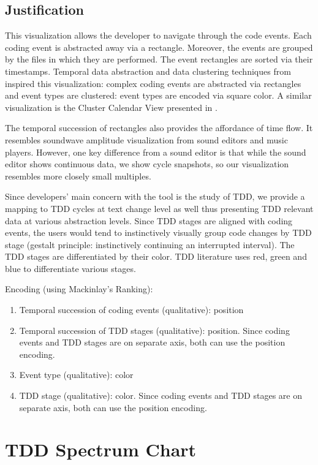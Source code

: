 \documentclass[journal]{vgtc}                %
\begin{document}
\subsection{Justification}

This visualization allows the developer to navigate through the code events.
Each coding event is abstracted away via a rectangle. Moreover, the events are grouped by the files in which they are performed. The event rectangles are sorted via their timestamps. Temporal data abstraction and data clustering techniques from \cite{one} inspired this visualization: complex coding events are abstracted via rectangles and event types are clustered: event types are encoded via square color. A similar visualization is the Cluster Calendar View presented in \cite{one}.

The temporal succession of rectangles also provides the affordance of time flow. It resembles soundwave amplitude visualization from sound editors and music players.
However, one key difference from a sound editor is that while the sound editor shows continuous data, we show cycle snapshots, so our visualization resembles more closely small multiples.

Since developers' main concern with the tool is the study of TDD, we provide a mapping to TDD cycles at text change level as well thus presenting TDD relevant data at various abstraction levels. 
Since TDD stages are aligned with coding events, the users would tend to instinctively visually group code changes by TDD stage (gestalt principle: instinctively continuing an interrupted interval).
The TDD stages are differentiated by their color. TDD literature uses red, green and blue to differentiate various stages.

Encoding (using Mackinlay's Ranking):
\begin{enumerate}
	\item Temporal succession of coding events (qualitative): position
	\item Temporal succession of TDD stages (qualitative): position. Since coding events and TDD stages are on separate axis, both can use the position encoding.
	\item Event type (qualitative): color
	\item TDD stage (qualitative): color. Since coding events and TDD stages are on separate axis, both can use the position encoding.
\end{enumerate}

\section{TDD Spectrum Chart}
\end{document}
